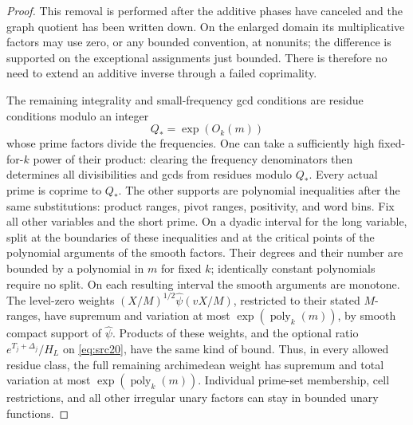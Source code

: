 \begin{proof}
This removal is performed after the additive phases have
canceled and the graph quotient has been written down.
On the enlarged domain its multiplicative factors may use
zero, or any bounded convention, at nonunits; the difference
is supported on the exceptional assignments just bounded.
There is therefore no need to extend an additive inverse
through a failed coprimality.

The remaining integrality and small-frequency gcd conditions
are residue conditions modulo an integer
\[
 Q_*=\exp(O_k(m))
\]
whose prime factors divide the frequencies. One can take
a sufficiently high fixed-for-\(k\) power of their product:
clearing the frequency denominators then determines all
divisibilities and gcds from residues modulo \(Q_*\).
Every actual prime is coprime to \(Q_*\).
The other supports are polynomial inequalities after the
same substitutions: product ranges, pivot ranges, positivity,
and word bins.
Fix all other variables and the short prime. On a dyadic
interval for the long variable, split at the boundaries of
these inequalities and at the critical points of the
polynomial arguments of the smooth factors. Their degrees
and their number are bounded by a polynomial in \(m\) for
fixed \(k\); identically constant polynomials require no
split. On each resulting interval the smooth arguments
are monotone. The level-zero weights
\((X/M)^{1/2}\widehat\psi(vX/M)\), restricted to their stated
\(M\)-ranges, have supremum and variation at most
\(\exp(\operatorname{poly}_k(m))\), by smooth compact support
of \(\widehat\psi\). Products of these weights, and the
optional ratio \(e^{T_j+\Delta_j}/H_L\) on
\eqref{eq:src20}, have the same kind of bound.
Thus, in every allowed residue class, the full remaining
archimedean weight has supremum and total variation at most
\(\exp(\operatorname{poly}_k(m))\).
Individual prime-set membership, cell restrictions, and all
other irregular unary factors can stay in bounded unary
functions.


\end{proof}

